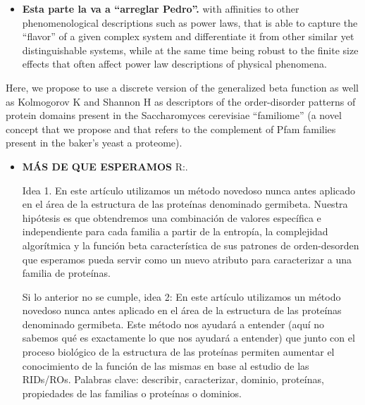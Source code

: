 \documentclass[preprint,12pt]{elsarticle}
\begin{document}
\bigbreak
\begin{itemize}
\item \color{red}
\textbf{Esta parte la va a “arreglar Pedro”.}
\bigbreak
with affinities to other phenomenological descriptions such as power laws, that is able to capture the “flavor” of a given complex system and differentiate it from other similar yet distinguishable systems, while at the same time being robust to the finite size effects that often affect power law descriptions of physical phenomena. 
\end{itemize}

\bigbreak

Here, we propose  to use a discrete version of the generalized beta function as well as Kolmogorov K and Shannon H as descriptors of the order-disorder patterns of protein domains present in the Saccharomyces cerevisiae “familiome” (a novel concept that we propose and that refers to the complement of Pfam families present in the baker’s yeast a proteome).



\bigbreak

\bigbreak

\begin{itemize}
\item 
\color{red}
\textbf{M{\'A}S DE QUE ESPERAMOS}
R:.
\bigbreak

Idea 1.
En este art{\'i}culo utilizamos un m{\'e}todo novedoso nunca antes aplicado en el {\'a}rea de la estructura de las prote{\'i}nas denominado germibeta. Nuestra hip{\'o}tesis es que obtendremos una combinaci{\'o}n de valores espec{\'i}fica e independiente para cada familia a partir de la entrop{\'i}a, la complejidad algor{\'i}tmica y la funci{\'o}n beta caracter{\'i}stica de sus patrones de orden-desorden que esperamos pueda servir como un nuevo atributo para caracterizar a una familia de prote{\'i}nas.

\bigbreak

Si lo anterior no se cumple, idea 2:
En este art{\'i}culo utilizamos un m{\'e}todo novedoso nunca antes aplicado en el {\'a}rea de la estructura de las prote{\'i}nas denominado germibeta. Este m{\'e}todo nos ayudar{\'a} a entender (aqu{\'i} no sabemos qu{\'e} es exactamente lo que nos ayudar{\'a} a entender) que junto con el proceso biol{\'o}gico de la estructura de las prote{\'i}nas permiten aumentar el conocimiento de la funci{\'o}n de las mismas en base al estudio de las RIDs/ROs.
Palabras clave: describir, caracterizar, dominio, prote{\'i}nas, propiedades de las familias o proteínas o dominios. 
\end{itemize}
\end{document}
